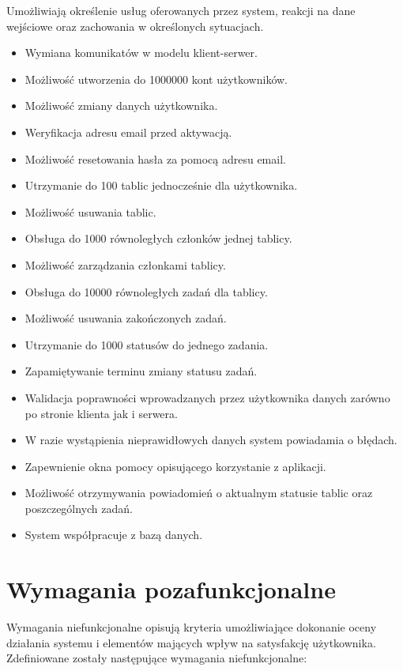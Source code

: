 \documentclass[12pt]{report}
\begin{document}
Umożliwiają określenie usług oferowanych przez system, reakcji na dane wejściowe oraz zachowania w określonych sytuacjach.
\begin{itemize}
\item Wymiana komunikatów w modelu klient-serwer.
\item Możliwość utworzenia do 1000000 kont użytkowników.
\item Możliwość zmiany danych użytkownika.
\item Weryfikacja adresu email przed aktywacją.
\item Możliwość resetowania hasła za pomocą adresu email.
\item Utrzymanie do 100 tablic jednocześnie dla użytkownika.
\item Możliwość usuwania tablic.
\item Obsługa do 1000 równoległych członków jednej tablicy.
\item Możliwość zarządzania członkami tablicy.
\item Obsługa do 10000 równoległych zadań dla tablicy.
\item Możliwość usuwania zakończonych zadań.
\item Utrzymanie do 1000 statusów do jednego zadania.
\item Zapamiętywanie terminu zmiany statusu zadań.
\item Walidacja poprawności wprowadzanych przez użytkownika danych zarówno po stronie klienta jak i serwera.
\item W razie wystąpienia nieprawidłowych danych system powiadamia o błędach.
\item Zapewnienie okna pomocy opisującego korzystanie z aplikacji.
\item Możliwość otrzymywania powiadomień o aktualnym statusie tablic oraz poszczególnych zadań.
\item System współpracuje z bazą danych.
\end{itemize}

\section{Wymagania pozafunkcjonalne}
Wymagania niefunkcjonalne opisują kryteria umożliwiające dokonanie oceny działania systemu i elementów mających wpływ na satysfakcję użytkownika.
Zdefiniowane zostały następujące wymagania niefunkcjonalne:
\end{document}
